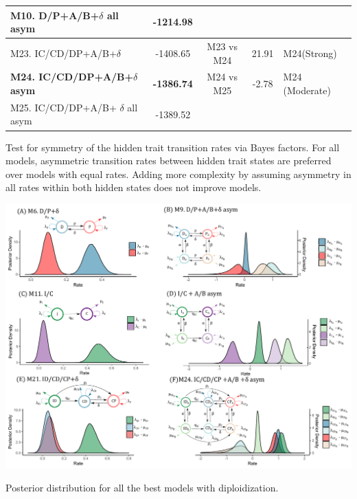 \begin{supptable}
\begin{tabular}{|l|c|c|c|l|}
M10. D/P+A/B+$\delta$ all asym        & -1214.98                     &                    &                         &                         \\ \hline
M23. IC/CD/DP+A/B+$\delta$                 & -1408.65                     &     M23 vs M24                & 21.91                   & M24(Strong)     \\
\textbf{M24. IC/CD/DP+A/B+$\delta$ asym} & \textbf{-1386.74}                     &   M24 vs M25              & -2.78                   & M24 (Moderate) \\
M25. IC/CD/DP+A/B+ $\delta$ all asym     & -1389.52                     &                     &                         &                         \\ \hline
\end{tabular}
\caption{Test for symmetry of the hidden trait transition rates via Bayes factors. For all models, asymmetric transition rates between hidden trait states are preferred over models with equal rates. Adding more complexity by assuming asymmetry in all rates within both hidden states does not improve models.} %
\label{supptable:asymmetry}
\end{supptable}



\begin{suppfigure}
\includegraphics[width=\textwidth]{alldiversificationasymhiddendip.pdf}
\caption{Posterior distribution for all the best models with diploidization.} %
\label{suppfigure:alldip}
\end{suppfigure}

